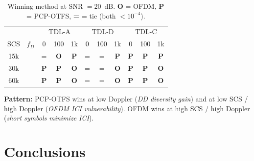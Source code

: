 \documentclass[11pt,a4paper,twoside]{article}
\begin{document}
\begin{table}[H]
\centering
\caption{Winning method at SNR $= 20$~dB. \textcolor{ofdmgreen}{\textbf{O}} = OFDM, \textcolor{pcpred}{\textbf{P}} = PCP-OTFS, \textbf{=} = tie (both $<10^{-4}$).}
\label{tab:winners}
\small
\begin{tabular}{cc|ccc|ccc|ccc}
\toprule
& & \multicolumn{3}{c|}{TDL-A} & \multicolumn{3}{c|}{TDL-D} & \multicolumn{3}{c}{TDL-C} \\
SCS & $f_D$ & 0 & 100 & 1k & 0 & 100 & 1k & 0 & 100 & 1k \\
\midrule
15k & & = & \textcolor{ofdmgreen}{\textbf{O}} & \textcolor{pcpred}{\textbf{P}} & = & = & \textcolor{pcpred}{\textbf{P}} & \textcolor{pcpred}{\textbf{P}} & \textcolor{pcpred}{\textbf{P}} & \textcolor{pcpred}{\textbf{P}} \\
30k & & \textcolor{pcpred}{\textbf{P}} & \textcolor{pcpred}{\textbf{P}} & \textcolor{ofdmgreen}{\textbf{O}} & = & = & \textcolor{ofdmgreen}{\textbf{O}} & \textcolor{pcpred}{\textbf{P}} & \textcolor{pcpred}{\textbf{P}} & \textcolor{ofdmgreen}{\textbf{O}} \\
60k & & \textcolor{pcpred}{\textbf{P}} & \textcolor{pcpred}{\textbf{P}} & \textcolor{ofdmgreen}{\textbf{O}} & = & = & \textcolor{ofdmgreen}{\textbf{O}} & \textcolor{pcpred}{\textbf{P}} & \textcolor{pcpred}{\textbf{P}} & \textcolor{ofdmgreen}{\textbf{O}} \\
\bottomrule
\end{tabular}
\end{table}

\textbf{Pattern:} PCP-OTFS wins at low Doppler (\emph{DD diversity gain}) and at low SCS / high Doppler (\emph{OFDM ICI vulnerability}). OFDM wins at high SCS / high Doppler (\emph{short symbols minimize ICI}).

\section{Conclusions}
\label{sec:conclusions}
\end{document}
